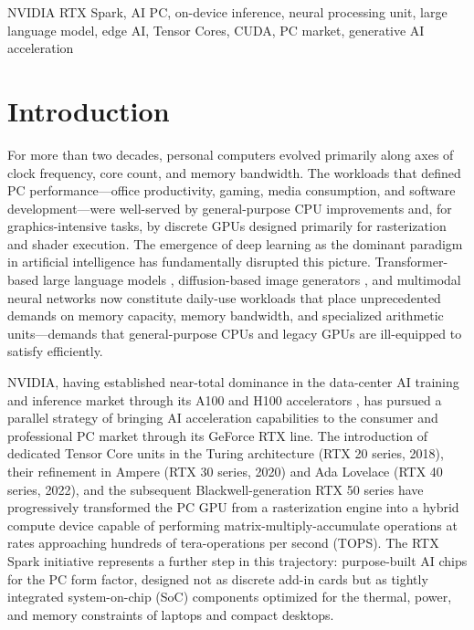 \documentclass[conference]{IEEEtran}
\begin{document}
\begin{IEEEkeywords}
NVIDIA RTX Spark, AI PC, on-device inference, neural processing unit, large language model, edge AI, Tensor Cores, CUDA, PC market, generative AI acceleration
\end{IEEEkeywords}

\section{Introduction}

For more than two decades, personal computers evolved primarily along axes of clock frequency, core count, and memory bandwidth. The workloads that defined PC performance---office productivity, gaming, media consumption, and software development---were well-served by general-purpose CPU improvements and, for graphics-intensive tasks, by discrete GPUs designed primarily for rasterization and shader execution. The emergence of deep learning as the dominant paradigm in artificial intelligence has fundamentally disrupted this picture. Transformer-based large language models \cite{vaswani2017attention}, diffusion-based image generators \cite{ho2020denoising}, and multimodal neural networks now constitute daily-use workloads that place unprecedented demands on memory capacity, memory bandwidth, and specialized arithmetic units---demands that general-purpose CPUs and legacy GPUs are ill-equipped to satisfy efficiently.

NVIDIA, having established near-total dominance in the data-center AI training and inference market through its A100 and H100 accelerators \cite{choquette2021nvidia}, has pursued a parallel strategy of bringing AI acceleration capabilities to the consumer and professional PC market through its GeForce RTX line. The introduction of dedicated Tensor Core units in the Turing architecture (RTX 20 series, 2018), their refinement in Ampere (RTX 30 series, 2020) and Ada Lovelace (RTX 40 series, 2022), and the subsequent Blackwell-generation RTX 50 series have progressively transformed the PC GPU from a rasterization engine into a hybrid compute device capable of performing matrix-multiply-accumulate operations at rates approaching hundreds of tera-operations per second (TOPS). The RTX Spark initiative represents a further step in this trajectory: purpose-built AI chips for the PC form factor, designed not as discrete add-in cards but as tightly integrated system-on-chip (SoC) components optimized for the thermal, power, and memory constraints of laptops and compact desktops.
\end{document}
